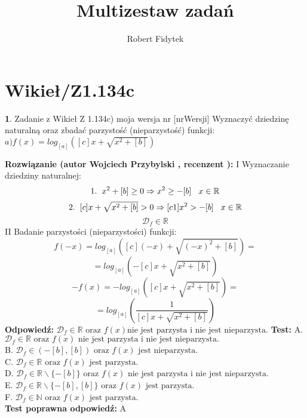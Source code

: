 \documentclass[12pt, a4paper]{article}
\title{Multizestaw zadań}
\author{Robert Fidytek}
\date{}
\theoremstyle{definition} %
\newtheorem{zad}{}
\newcommand{\kategoria}[1]{\section{#1}} %
\newcommand{\zadStart}[1]{\begin{zad}#1\newline} %
\newcommand{\zadStop}{\end{zad}}   %
\newcommand{\rozwStart}[2]{\noindent \textbf{Rozwiązanie (autor #1 , recenzent #2): }\newline} %
\newcommand{\rozwStop}{\newline}                                            %
\newcommand{\odpStart}{\noindent \textbf{Odpowiedź:}\newline}    %
\newcommand{\odpStop}{\newline}                                             %
\newcommand{\testStart}{\noindent \textbf{Test:}\newline} %
\newcommand{\testStop}{\newline} %
\newcommand{\kluczStart}{\noindent \textbf{Test poprawna odpowiedź:}\newline} %
\newcommand{\kluczStop}{\newline} %
\begin{document}
\maketitle


\kategoria{Wikieł/Z1.134c}
\zadStart{Zadanie z Wikieł Z 1.134c) moja wersja nr [nrWersji]}
Wyznaczyć dziedzinę naturalną oraz zbadać parzystość (nieparzystość) funkcji:\\
$a) f(x)=log_{[a]}([c]x+\sqrt{x^{2}+[b]})$
\zadStop
\rozwStart{Wojciech Przybylski}{}
I Wyznaczanie dziedziny naturalnej:\\
$$1.\hspace{2mm}x^{2}+[b]\geq0 \Rightarrow x^{2}\geq-[b] \hspace{3mm} x\in\mathbb{R}$$
$$2.\hspace{2mm}[c]x+\sqrt{x^{2}+[b]}>0 \Rightarrow [c1]x^{2}>-[b]\hspace{3mm} x\in\mathbb{R}$$
$$\mathcal{D}_{f}\in\mathbb{R}$$
II Badanie parzystości (nieparzystości) funkcji:
$$f(-x)=log_{[a]}([c](-x)+\sqrt{(-x)^{2}+[b]})=$$
$$=log_{[a]}(-[c]x+\sqrt{x^{2}+[b]})$$
$$-f(x)=-log_{[a]}([c]x+\sqrt{x^{2}+[b]})=$$
$$=log_{[a]}(\frac{1}{[c]x+\sqrt{x^{2}+[b]}})$$
\rozwStop
\odpStart
$\mathcal{D}_{f}\in\mathbb{R} \mbox{ oraz } f(x)\mbox{nie jest parzysta i nie jest nieparzysta.}$ 
\odpStop
\testStart
A. $\mathcal{D}_{f}\in\mathbb{R} \mbox{ oraz } f(x)\mbox{ nie jest parzysta i nie jest nieparzysta.}$  \\
B. $\mathcal{D}_{f}\in (-[b],[b]) \mbox{ oraz } f(x)\mbox{ jest nieparzysta.}$ \\
C. $\mathcal{D}_{f}\in \mathbb{R} \mbox{ oraz } f(x)\mbox{ jest parzysta.}$ \\
D. $\mathcal{D}_{f}\in \mathbb{R}\backslash\{-[b]\} \mbox{ oraz } f(x)\mbox{ nie jest parzysta i nie jest nieparzysta.}$ \\
E. $\mathcal{D}_{f}\in \mathbb{R}{\backslash}\{-[b],[b]\} \mbox{ oraz } f(x)\mbox{ jest parzysta.}$ \\
F. $\mathcal{D}_{f}\in \mathbb{N} \mbox{ oraz } f(x)\mbox{ jest parzysta.}$ \\
\testStop
\kluczStart
A
\kluczStop
\end{document}
